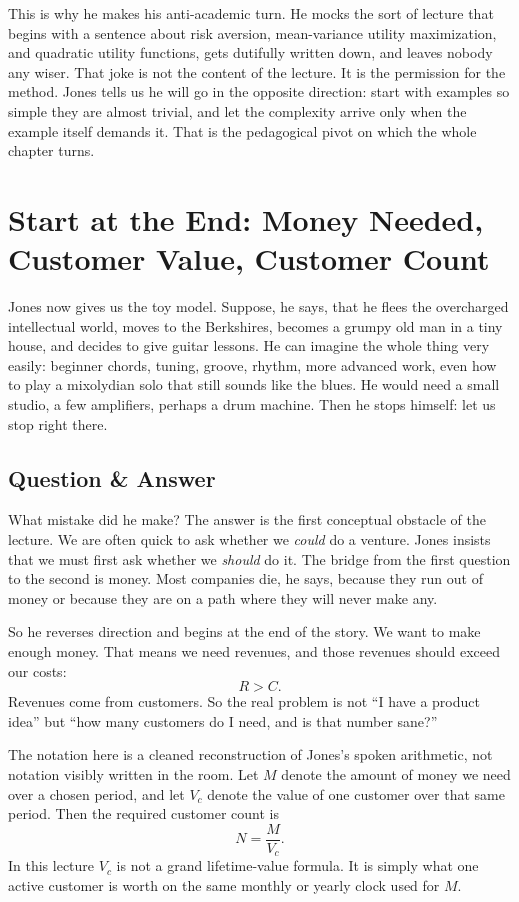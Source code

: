 This is why he makes his anti-academic turn. He mocks the sort of lecture that begins with a sentence about risk aversion, mean-variance utility maximization, and quadratic utility functions, gets dutifully written down, and leaves nobody any wiser. That joke is not the content of the lecture. It is the permission for the method. Jones tells us he will go in the opposite direction: start with examples so simple they are almost trivial, and let the complexity arrive only when the example itself demands it. That is the pedagogical pivot on which the whole chapter turns.

\section{Start at the End: Money Needed, Customer Value, Customer Count}

Jones now gives us the toy model. Suppose, he says, that he flees the overcharged intellectual world, moves to the Berkshires, becomes a grumpy old man in a tiny house, and decides to give guitar lessons. He can imagine the whole thing very easily: beginner chords, tuning, groove, rhythm, more advanced work, even how to play a mixolydian solo that still sounds like the blues. He would need a small studio, a few amplifiers, perhaps a drum machine. Then he stops himself: let us stop right there.

\subsection{Question \& Answer}

What mistake did he make? The answer is the first conceptual obstacle of the lecture. We are often quick to ask whether we \emph{could} do a venture. Jones insists that we must first ask whether we \emph{should} do it. The bridge from the first question to the second is money. Most companies die, he says, because they run out of money or because they are on a path where they will never make any.

So he reverses direction and begins at the end of the story. We want to make enough money. That means we need revenues, and those revenues should exceed our costs:
\begin{equation}
R>C.
\end{equation}
Revenues come from customers. So the real problem is not ``I have a product idea'' but ``how many customers do I need, and is that number sane?''

The notation here is a cleaned reconstruction of Jones's spoken arithmetic, not notation visibly written in the room. Let \(M\) denote the amount of money we need over a chosen period, and let \(V_c\) denote the value of one customer over that same period. Then the required customer count is
\begin{equation}
N=\frac{M}{V_c}.
\end{equation}
In this lecture \(V_c\) is not a grand lifetime-value formula. It is simply what one active customer is worth on the same monthly or yearly clock used for \(M\).

